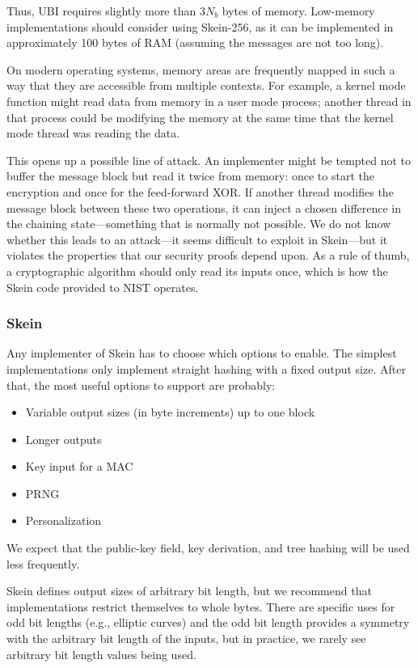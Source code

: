 \documentclass[11pt,twoside]{article}
\begin{document}
Thus, UBI requires slightly more than $3N_b$ bytes of memory. Low-memory implementations should consider using Skein-256, as it can be implemented in approximately 100 bytes of RAM (assuming the messages are not too long).

On modern operating systems, memory areas are frequently mapped in such a way that they are accessible from multiple contexts.  For example, a kernel mode function might read data from memory in a user mode process; another thread in that process could be modifying the memory at the same time that the kernel mode thread was reading the data.

This opens up a possible line of attack. An implementer might be tempted not to buffer the message block but read it twice from memory: once to start the encryption and once for the feed-forward XOR. If another thread modifies the message block between these two operations, it can inject a chosen difference in the chaining state---something that is normally not possible.  We do not know whether this leads to an attack---it seems difficult to exploit in Skein---but it violates the properties that our security proofs depend upon.  As a rule of thumb, a cryptographic algorithm should only read its inputs once, which is how the Skein code provided to NIST operates.

\subsubsection{Skein}

Any implementer of Skein has to choose which options to enable.  The simplest implementations only implement straight hashing with a fixed output size.  After that, the most useful options to support are probably:
\begin{itemize}
  \item Variable output sizes (in byte increments) up to one block
  \item Longer outputs
  \item Key input for a MAC
  \item PRNG
  \item Personalization
\end{itemize}
%
We expect that the public-key field, key derivation, and tree hashing will be used less frequently.

Skein defines output sizes of arbitrary bit length, but we recommend that implementations restrict themselves to whole bytes.  There are specific uses for odd bit lengths (e.g., elliptic curves) and the odd bit length provides a symmetry with the arbitrary bit length of the inputs, but in practice, we rarely see arbitrary bit length values being used.
\end{document}
